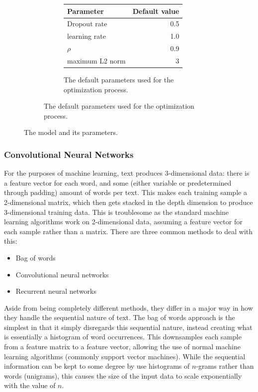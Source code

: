 \begin{figure}[p]
\begin{subfigure}[b]{0.45\textwidth}
    \begin{subfigure}[b]{\textwidth}
      \centering
      \begin{tabular}{lr}
	\toprule
	Parameter & Default value \\
	\midrule
	Dropout rate & 0.5 \\
	learning rate & 1.0 \\
	$\rho$ & 0.9 \\
	maximum L2 norm & 3 \\
	\bottomrule
      \end{tabular}
      \caption{The default parameters used for the optimization process.}
    \end{subfigure}
  \end{subfigure}
  \caption{The model and its parameters.\label{fig:model_full}}
\end{figure}

\subsubsection{Convolutional Neural Networks}
For the purposes of machine learning,
text produces 3-dimensional data: there is a feature vector for each word, and
some (either variable or predetermined through padding) amount of words per
text. This makes each training sample a 2-dimensional matrix, which then gets
stacked in the depth dimension to produce 3-dimensional training data. This is
troublesome as the standard machine learning algorithms work on 2-dimensional
data, assuming a feature vector for each sample rather than a matrix. There are
three common methods to deal with this:
\begin{itemize}
\item Bag of words
\item Convolutional neural networks
\item Recurrent neural networks
\end{itemize}

Aside from being completely different methods, they differ in a major way in how
they handle the sequential nature of text. The bag of words approach is the
simplest in that it simply disregards this sequential nature, instead creating
what is essentially a histogram of word occurrences. This downsamples each
sample from a feature matrix to a feature vector, allowing the use of normal
machine learning algorithms (commonly support vector machines). While the
sequential information can be kept to some degree by use histograms of $n$-grams
rather than words (unigrams), this causes the size of the input data to scale
exponentially with the value of $n$.

